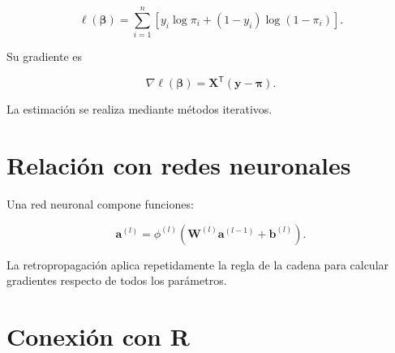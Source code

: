 \documentclass[
  spanish,
  10.5pt,
  letterpaper,
  DIV=11,
  numbers=noendperiod,
  oneside,
  open=any]{scrreprt}
\theoremstyle{definition}
\theoremstyle{definition}
\theoremstyle{plain}
\theoremstyle{remark}
\begin{document}
\[
\ell(\boldsymbol{\beta})
=
\sum_{i=1}^{n}
\left[
y_i\log\pi_i
+
(1-y_i)\log(1-\pi_i)
\right].
\]

Su gradiente es

\[
\nabla\ell(\boldsymbol{\beta})
=
\mathbf{X}^{\mathsf T}
(
\mathbf{y}
-
\boldsymbol{\pi}
).
\]

La estimación se realiza mediante métodos iterativos.

\section*{Relación con redes
neuronales}\label{relaciuxf3n-con-redes-neuronales-1}


Una red neuronal compone funciones:

\[
\mathbf{a}^{(l)}
=
\phi^{(l)}
\left(
\mathbf{W}^{(l)}
\mathbf{a}^{(l-1)}
+
\mathbf{b}^{(l)}
\right).
\]

La retropropagación aplica repetidamente la regla de la cadena para
calcular gradientes respecto de todos los parámetros.

\section*{Conexión con R}\label{conexiuxf3n-con-r-3}

\end{document}

